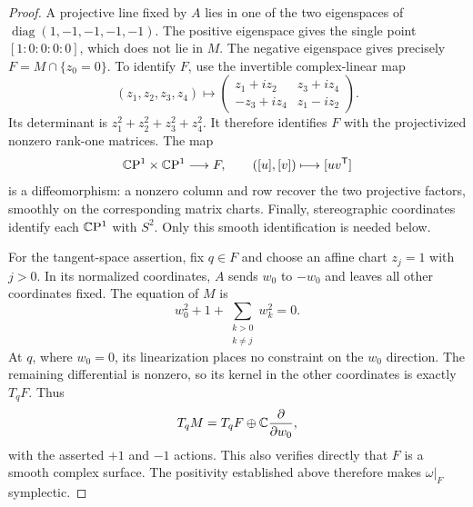 \begin{proof}
A projective line fixed by $A$ lies in one of the two eigenspaces of
$\operatorname{diag}(1,-1,-1,-1,-1)$.  The positive eigenspace gives
the single point $[1:0:0:0:0]$, which does not lie in $M$.  The
negative eigenspace gives precisely $F=M\cap\{z_0=0\}$.  To identify
$F$, use the invertible complex-linear map
\[
 (z_1,z_2,z_3,z_4)\longmapsto
 \begin{pmatrix}
  z_1+iz_2&z_3+iz_4\\
  -z_3+iz_4&z_1-iz_2
 \end{pmatrix}.
\]
Its determinant is $z_1^2+z_2^2+z_3^2+z_4^2$.  It therefore
identifies $F$ with the projectivized nonzero rank-one matrices.
The map
\[
 \mathbb C\mathrm P^1\times\mathbb C\mathrm P^1\longrightarrow F,
 \qquad ([u],[v])\longmapsto[uv^{\mathsf T}]
\]
is a diffeomorphism: a nonzero column and row recover the two
projective factors, smoothly on the corresponding matrix charts.
Finally, stereographic coordinates identify each $\mathbb C\mathrm P^1$ with
$S^2$.  Only this smooth identification is needed below.

For the tangent-space assertion, fix $q\in F$ and choose an affine
chart $z_j=1$ with $j>0$.  In its normalized coordinates, $A$ sends
$w_0$ to $-w_0$ and leaves all other coordinates fixed.  The equation
of $M$ is
\[
 w_0^2+1+\sum_{\substack{k>0\\k\ne j}}w_k^2=0.
\]
At $q$, where $w_0=0$, its linearization places no constraint on
the $w_0$ direction.  The remaining differential is nonzero, so its
kernel in the other coordinates is exactly $T_qF$.  Thus
\[
 T_qM=T_qF\oplus\mathbb C\frac{\partial}{\partial w_0},
\]
with the asserted $+1$ and $-1$ actions.  This also verifies directly
that $F$ is a smooth complex surface. The positivity established above
therefore makes $\omega|_F$ symplectic.
\end{proof}
